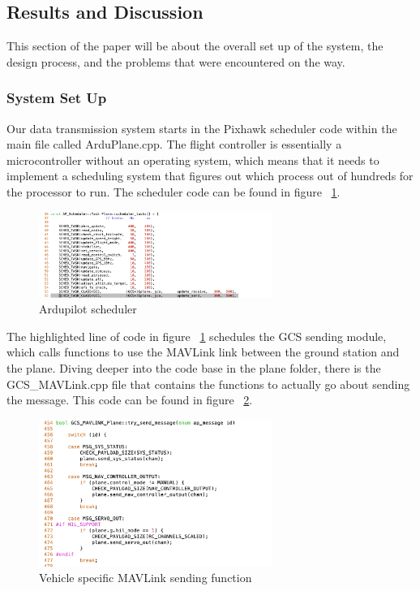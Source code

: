 \documentclass[12pt,journal,compsoc]{IEEEtran}
\begin{document}
\subsection{Results and Discussion}
This section of the paper will be about the overall set up of the system, the design process, and the problems that were encountered on the way.
\subsubsection{System Set Up}
Our data transmission system starts in the Pixhawk scheduler code within the main file called ArduPlane.cpp. The flight controller is essentially a microcontroller without an operating system, which means that it needs to implement a scheduling system that figures out which process out of hundreds for the processor to run. The scheduler code can be found in figure ~\ref{mavSched}.
\begin{figure}[h!]
\hspace*{0cm}
\centering
\includegraphics[width=3in]{Scheduler.png}
\caption{Ardupilot scheduler}
\label{mavSched}
\end{figure}

The highlighted line of code in figure ~\ref{mavSched} schedules the GCS sending module, which calls functions to use the MAVLink link between the ground station and the plane. Diving deeper into the code base in the plane folder, there is the GCS\_MAVLink.cpp file that contains the functions to actually go about sending the message. This code can be found in figure ~\ref{gcsMav}.

\begin{figure}[h!]
\hspace*{0cm}
\centering
\includegraphics[width=3in]{GCS_Mavlink.png}
\caption{Vehicle specific MAVLink sending function}
\label{gcsMav}
\end{figure}
\end{document}
